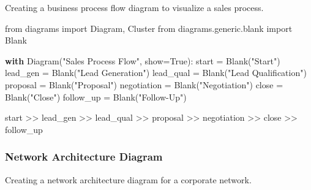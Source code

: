 \documentclass[
  letterpaper,
  DIV=11,
  numbers=noendperiod]{scrreprt}
\newenvironment{Shaded}{\begin{snugshade}}{\end{snugshade}}
\newcommand{\ControlFlowTok}[1]{\textcolor[rgb]{0.00,0.23,0.31}{\textbf{#1}}}
\newcommand{\ImportTok}[1]{\textcolor[rgb]{0.00,0.46,0.62}{#1}}
\newcommand{\NormalTok}[1]{\textcolor[rgb]{0.00,0.23,0.31}{#1}}
\newcommand{\OperatorTok}[1]{\textcolor[rgb]{0.37,0.37,0.37}{#1}}
\newcommand{\StringTok}[1]{\textcolor[rgb]{0.13,0.47,0.30}{#1}}
\newcommand{\VariableTok}[1]{\textcolor[rgb]{0.07,0.07,0.07}{#1}}
\begin{document}
Creating a business process flow diagram to visualize a sales process.

\begin{Shaded}
\begin{Highlighting}[]
\ImportTok{from}\NormalTok{ diagrams }\ImportTok{import}\NormalTok{ Diagram, Cluster}
\ImportTok{from}\NormalTok{ diagrams.generic.blank }\ImportTok{import}\NormalTok{ Blank}

\ControlFlowTok{with}\NormalTok{ Diagram(}\StringTok{"Sales Process Flow"}\NormalTok{, show}\OperatorTok{=}\VariableTok{True}\NormalTok{):}
\NormalTok{    start }\OperatorTok{=}\NormalTok{ Blank(}\StringTok{"Start"}\NormalTok{)}
\NormalTok{    lead\_gen }\OperatorTok{=}\NormalTok{ Blank(}\StringTok{"Lead Generation"}\NormalTok{)}
\NormalTok{    lead\_qual }\OperatorTok{=}\NormalTok{ Blank(}\StringTok{"Lead Qualification"}\NormalTok{)}
\NormalTok{    proposal }\OperatorTok{=}\NormalTok{ Blank(}\StringTok{"Proposal"}\NormalTok{)}
\NormalTok{    negotiation }\OperatorTok{=}\NormalTok{ Blank(}\StringTok{"Negotiation"}\NormalTok{)}
\NormalTok{    close }\OperatorTok{=}\NormalTok{ Blank(}\StringTok{"Close"}\NormalTok{)}
\NormalTok{    follow\_up }\OperatorTok{=}\NormalTok{ Blank(}\StringTok{"Follow{-}Up"}\NormalTok{)}

\NormalTok{    start }\OperatorTok{\textgreater{}\textgreater{}}\NormalTok{ lead\_gen }\OperatorTok{\textgreater{}\textgreater{}}\NormalTok{ lead\_qual }\OperatorTok{\textgreater{}\textgreater{}}\NormalTok{ proposal }\OperatorTok{\textgreater{}\textgreater{}}\NormalTok{ negotiation }\OperatorTok{\textgreater{}\textgreater{}}\NormalTok{ close }\OperatorTok{\textgreater{}\textgreater{}}\NormalTok{ follow\_up}
\end{Highlighting}
\end{Shaded}

\subsubsection{Network Architecture
Diagram}\label{network-architecture-diagram}

Creating a network architecture diagram for a corporate network.
\end{document}
